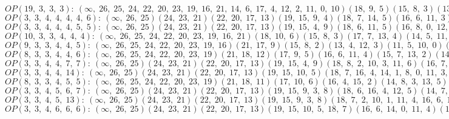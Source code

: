 $OP(19, \;3, \;3, \;3): \:(\infty, \;26, \;25, \;24, \;22, \;20, \;23, \;19, \;16, \;21, \;14, \;6, \;17, \;4, \;12, \;2, \;11, \;0, \;10)(18, \;9, \;5)(15, \;8, \;3)(13, \;7, \;1)$\\
$OP(3, \;3, \;4, \;4, \;4, \;4, \;6): \:(\infty, \;26, \;25)(24, \;23, \;21)(22, \;20, \;17, \;13)(19, \;15, \;9, \;4)(18, \;7, \;14, \;5)(16, \;6, \;11, \;3)(12, \;1, \;8, \;2, \;10, \;0)$\\
$OP(3, \;3, \;4, \;4, \;4, \;5, \;5): \:(\infty, \;26, \;25)(24, \;23, \;21)(22, \;20, \;17, \;13)(19, \;15, \;4, \;9)(18, \;6, \;11, \;5)(16, \;8, \;0, \;12, \;2)(14, \;7, \;1, \;10, \;3)$\\
$OP(10, \;3, \;3, \;4, \;4, \;4): \:(\infty, \;26, \;25, \;24, \;22, \;20, \;23, \;19, \;16, \;21)(18, \;10, \;6)(15, \;8, \;3)(17, \;7, \;13, \;4)(14, \;5, \;11, \;0)(12, \;2, \;9, \;1)$\\
$OP(9, \;3, \;3, \;4, \;4, \;5): \:(\infty, \;26, \;25, \;24, \;22, \;20, \;23, \;19, \;16)(21, \;17, \;9)(15, \;8, \;2)(13, \;4, \;12, \;3)(11, \;5, \;10, \;0)(18, \;7, \;14, \;1, \;6)$\\
$OP(8, \;3, \;3, \;4, \;4, \;6): \:(\infty, \;26, \;25, \;24, \;22, \;20, \;23, \;19)(21, \;18, \;12)(17, \;9, \;5)(16, \;6, \;11, \;4)(15, \;7, \;13, \;2)(14, \;3, \;8, \;1, \;10, \;0)$\\
$OP(3, \;3, \;4, \;4, \;7, \;7): \:(\infty, \;26, \;25)(24, \;23, \;21)(22, \;20, \;17, \;13)(19, \;15, \;4, \;9)(18, \;8, \;2, \;10, \;3, \;11, \;6)(16, \;7, \;1, \;14, \;0, \;12, \;5)$\\
$OP(3, \;3, \;4, \;4, \;14): \:(\infty, \;26, \;25)(24, \;23, \;21)(22, \;20, \;17, \;13)(19, \;15, \;10, \;5)(18, \;7, \;16, \;4, \;14, \;1, \;8, \;0, \;11, \;3, \;9, \;2, \;12, \;6)$\\
$OP(8, \;3, \;3, \;4, \;5, \;5): \:(\infty, \;26, \;25, \;24, \;22, \;20, \;23, \;19)(21, \;18, \;11)(17, \;10, \;6)(16, \;4, \;15, \;2)(14, \;8, \;3, \;13, \;5)(12, \;7, \;1, \;9, \;0)$\\
$OP(3, \;3, \;4, \;5, \;6, \;7): \:(\infty, \;26, \;25)(24, \;23, \;21)(22, \;20, \;17, \;13)(19, \;15, \;9, \;3, \;8)(18, \;6, \;16, \;4, \;12, \;5)(14, \;7, \;2, \;10, \;1, \;11, \;0)$\\
$OP(3, \;3, \;4, \;5, \;13): \:(\infty, \;26, \;25)(24, \;23, \;21)(22, \;20, \;17, \;13)(19, \;15, \;9, \;3, \;8)(18, \;7, \;2, \;10, \;1, \;11, \;4, \;16, \;6, \;14, \;0, \;12, \;5)$\\
$OP(3, \;3, \;4, \;6, \;6, \;6): \:(\infty, \;26, \;25)(24, \;23, \;21)(22, \;20, \;17, \;13)(19, \;15, \;10, \;5, \;18, \;7)(16, \;6, \;14, \;0, \;11, \;4)(12, \;3, \;9, \;1, \;8, \;2)$\\
